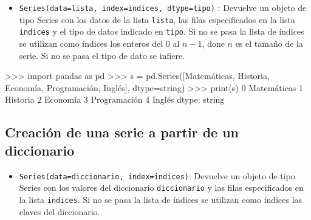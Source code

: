 \documentclass[
  spanish,
  a4paper,
]{scrreport}
\newenvironment{Shaded}{\begin{snugshade}}{\end{snugshade}}
\newcommand{\BuiltInTok}[1]{\textcolor[rgb]{0.00,0.23,0.31}{#1}}
\newcommand{\DecValTok}[1]{\textcolor[rgb]{0.68,0.00,0.00}{#1}}
\newcommand{\ImportTok}[1]{\textcolor[rgb]{0.00,0.46,0.62}{#1}}
\newcommand{\NormalTok}[1]{\textcolor[rgb]{0.00,0.23,0.31}{#1}}
\newcommand{\OperatorTok}[1]{\textcolor[rgb]{0.37,0.37,0.37}{#1}}
\newcommand{\StringTok}[1]{\textcolor[rgb]{0.13,0.47,0.30}{#1}}
\providecommand{\tightlist}{%
  \setlength{\itemsep}{0pt}\setlength{\parskip}{0pt}}
\begin{document}
\begin{itemize}
\tightlist
\item
  \texttt{Series(data=lista,\ index=indices,\ dtype=tipo)} : Devuelve un
  objeto de tipo Series con los datos de la lista \texttt{lista}, las
  filas especificados en la lista \texttt{indices} y el tipo de datos
  indicado en \texttt{tipo}. Si no se pasa la lista de índices se
  utilizan como índices los enteros del 0 al \(n-1\), done \(n\) es el
  tamaño de la serie. Si no se pasa el tipo de dato se infiere.
\end{itemize}

\begin{Shaded}
\begin{Highlighting}[]
\OperatorTok{\textgreater{}\textgreater{}\textgreater{}} \ImportTok{import}\NormalTok{ pandas }\ImportTok{as}\NormalTok{ pd}
\OperatorTok{\textgreater{}\textgreater{}\textgreater{}}\NormalTok{ s }\OperatorTok{=}\NormalTok{ pd.Series([}\StringTok{\textquotesingle{}Matemáticas\textquotesingle{}}\NormalTok{, }\StringTok{\textquotesingle{}Historia\textquotesingle{}}\NormalTok{, }\StringTok{\textquotesingle{}Economía\textquotesingle{}}\NormalTok{, }\StringTok{\textquotesingle{}Programación\textquotesingle{}}\NormalTok{, }\StringTok{\textquotesingle{}Inglés\textquotesingle{}}\NormalTok{], dtype}\OperatorTok{=}\StringTok{\textquotesingle{}string\textquotesingle{}}\NormalTok{)}
\OperatorTok{\textgreater{}\textgreater{}\textgreater{}} \BuiltInTok{print}\NormalTok{(s)}
\DecValTok{0}\NormalTok{     Matemáticas}
\DecValTok{1}\NormalTok{        Historia}
\DecValTok{2}\NormalTok{        Economía}
\DecValTok{3}\NormalTok{    Programación}
\DecValTok{4}\NormalTok{          Inglés}
\NormalTok{dtype: string}
\end{Highlighting}
\end{Shaded}

\subsection{Creación de una serie a partir de un
diccionario}\label{creaciuxf3n-de-una-serie-a-partir-de-un-diccionario}

\begin{itemize}
\tightlist
\item
  \texttt{Series(data=diccionario,\ index=indices)}: Devuelve un objeto
  de tipo Series con los valores del diccionario \texttt{diccionario} y
  las filas especificados en la lista \texttt{indices}. Si no se pasa la
  lista de índices se utilizan como índices las claves del diccionario.
\end{itemize}
\end{document}
